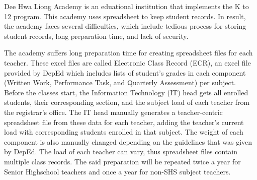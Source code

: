 \documentclass[11pt,a4paper,titlepage]{article}
\begin{document}




Dee Hwa Liong Academy is an eduational institution that implements the K to 12 program. This academy uses spreadsheet to keep student records. In result, the academy faces several difficulties, which include tedious process for storing student records, long preparation time, and lack of security.

The academy suffers long preparation time for creating spreadsheet files for each teacher. These excel files are called Electronic Class Record (ECR), an excel file provided by DepEd which includes lists of student's grades in each component (Written Work, Performance Task, and Quarterly Assessment) per subject. Before the classes start, the Information Technology (IT) head gets all enrolled students, their corresponding section, and the subject load of each teacher from the registrar's office. The IT head manually generates a teacher-centric spreadsheet file from these data for each teacher, adding the teacher's current load with corresponding students enrolled in that subject. The weight of each component is also manually changed depending on the guidelines that was given by DepEd. The load of each teacher can vary, thus spreadsheet files contain multiple class records. The said preparation will be repeated twice a year for Senior Highschool teachers and once a year for non-SHS subject teachers.
\end{document}
